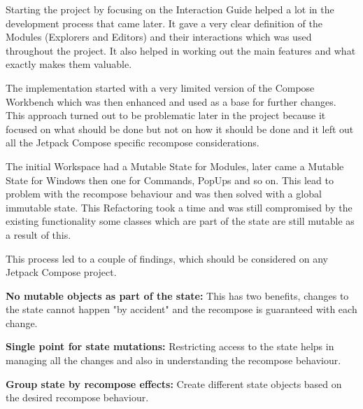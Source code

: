 Starting the project by focusing on the Interaction Guide helped a lot in the development process that came later. It gave a very clear definition of the Modules (Explorers and Editors) and their interactions which was used throughout the project. It also helped in working out the main features and what exactly makes them valuable.

The implementation started with a very limited version of the Compose Workbench which was then enhanced and used as a base for further changes. This approach turned out to be problematic later in the project because it focused on what should be done but not on how it should be done and it left out all the Jetpack Compose specific recompose considerations.

The initial Workspace had a Mutable State for Modules, later came a Mutable State for Windows then one for Commands, PopUps and so on. This lead to problem with the recompose behaviour and was then solved with a global immutable state. This Refactoring took a time and was still compromised by the existing functionality some classes which are part of the state are still mutable as a result of this.

This process led to a couple of findings, which should be considered on any Jetpack Compose project.

\textbf{No mutable objects as part of the state:} This has two benefits, changes to the state cannot happen "by accident" and the recompose is guaranteed with each change.

\textbf{Single point for state mutations:} Restricting access to the state helps in managing all the changes and also in understanding the recompose behaviour. 

\textbf{Group state by recompose effects:} Create different state objects based on the desired recompose behaviour. 

